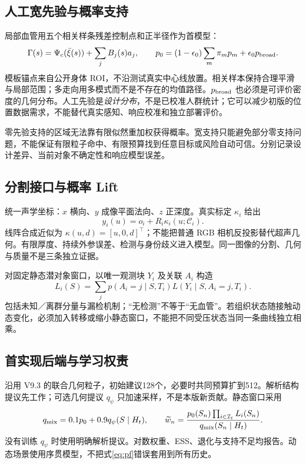 \documentclass[UTF8,fontset=fandol,11pt,a4paper]{ctexart}
\theoremstyle{plain}
\theoremstyle{definition}
\theoremstyle{remark}
\numberwithin{equation}{section}
\begin{document}
\subsection{人工宽先验与概率支持}
局部血管用五个相关样条残差控制点和正半径作为首模型：
\begin{equation}
\Gamma(s)=\Psi_c(\bar\xi(s))+\sum_j B_j(s)a_j,
\qquad
p_0=(1-\epsilon_0)\sum_m\pi_mp_m+\epsilon_0p_{\rm broad}.
\label{eq:anatomyprior}
\end{equation}
模板锚点来自公开身体 ROI，不沿测试真实中心线放置。相关样本保持合理平滑与局部范围；多走向用多模式而不是不存在的均值路径。$p_{\rm broad}$ 也必须是可评价密度的几何分布。人工先验是\emph{设计分布}，不是已校准人群统计；它可以减少初版的位置数据需求，不能替代真实感知、响应校准和独立部署评价。

零先验支持的区域无法靠有限似然重加权获得概率。宽支持只能避免部分零支持问题，不能保证有限粒子命中、有限预算找到任意目标或风险自动可信。分别记录设计差异、当前对象不确定性和响应模型误差。

\subsection{分割接口与概率 Lift}
统一声学坐标：$x$ 横向、$y$ 成像平面法向、$z$ 正深度。真实标定 $\kappa_i$ 给出
\begin{equation}
y_i(u)=o_i+R_i\kappa_i(u;\mathcal C_i).
\end{equation}
线阵合成近似为 $\kappa(u,d)=[u,0,d]^\top$；不能把普通 RGB 相机反投影替代超声几何。有限厚度、持续外参误差、检测与身份歧义进入模型。同一图像的分割、几何与质量不是三条独立证据。

对固定静态潜对象窗口，以唯一观测块 $Y_i$ 及关联 $A_i$ 构造
\begin{equation}
L_i(S)=\sum_jp(A_i=j\mid S,T_i)L(Y_i\mid S,A_i=j,T_i).
\end{equation}
包括未知／离群分量与漏检机制；“无检测”不等于“无血管”。若组织状态随接触动态变化，必须加入转移或缩小静态窗口，不能把不同受压状态当同一条曲线独立相乘。

\subsection{首实现后端与学习权责}
沿用 V9.3 的联合几何粒子，初始建议128个，必要时共同预算扩到512。解析结构提议先工作；可选几何提议 $q_\psi$ 只加速采样，不是本版新贡献。静态窗口采用
\begin{equation}
q_{\rm mix}=0.1p_0+0.9q_\psi(S\mid H_t),\qquad
\widetilde w_n=\frac{p_0(S_n)\prod_{i\in\mathcal I_t}L_i(S_n)}{q_{\rm mix}(S_n\mid H_t)}.
\label{eq:pf}
\end{equation}
没有训练 $q_\psi$ 时使用明确解析提议。对数权重、ESS、退化与支持不足均报告。动态场景使用序贯模型，不把式\eqref{eq:pf}错误套用到所有历史。
\end{document}
